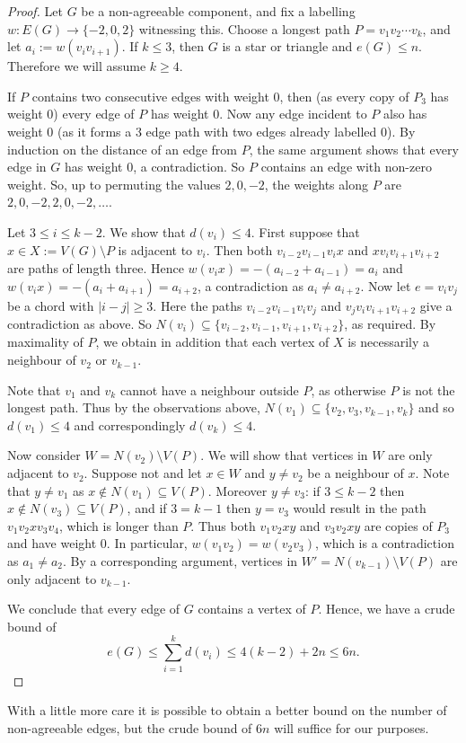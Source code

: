 \documentclass[A4paper,12pt]{article}
\theoremstyle{definition}
\begin{document}
\begin{proof}
Let $G$ be a non-agreeable component, and fix a labelling
$w:E(G)\to\{-2,0,2\}$ witnessing this. Choose a longest path
$P=v_1v_2\cdots v_k$, and let $a_i := w(v_iv_{i+1})$. If $k \le 3$, then $G$ is a star or triangle and $e(G) \le n$. Therefore we will assume $k \ge 4$. 

If $P$ contains two consecutive edges with weight 0, then (as every copy of $P_3$ has weight 0) every edge of $P$ has weight 0. Now any edge incident to $P$ also has weight 0 (as it forms a 3 edge path with two edges already labelled 0). By induction on the distance of an edge from $P$, the same argument shows
that every edge in $G$ has weight $0$, a contradiction. So $P$ contains an edge with non-zero weight. So, up to permuting the values $2,0,-2$,
the weights along $P$ are $2,0,-2,2,0,-2,\ldots$. 

Let $3\le i\le k-2$. We show that $d(v_i) \le 4$. First suppose that
$x \in X := V(G) \setminus P$ is adjacent to $v_i$. Then both
$v_{i-2}v_{i-1}v_ix$ and $xv_iv_{i+1}v_{i+2}$ are paths of length three.
Hence $w(v_ix)=-(a_{i-2}+a_{i-1})=a_i$ and $w(v_ix)=-(a_i+a_{i+1})=a_{i+2}$, a contradiction as $a_i\ne a_{i+2}$. Now let
$e=v_iv_j$ be a chord with $|i-j|\ge 3$. Here the paths
$v_{i-2}v_{i-1}v_iv_j$ and $v_jv_iv_{i+1}v_{i+2}$ give a contradiction as above. So $N(v_i) \subseteq \{v_{i-2},v_{i-1},v_{i+1},v_{i+2}\}$, as required. By maximality of $P$, we obtain in addition that each vertex of $X$ is necessarily a neighbour of $v_2$ or $v_{k-1}$. 

Note that $v_1$ and $v_k$ cannot have a neighbour outside $P$, as otherwise $P$ is not the longest path. Thus by the observations above, $N(v_1) \subseteq \{v_2,v_3,v_{k-1},v_k\}$ and so $d(v_1) \le 4$ and correspondingly $d(v_k) \le 4$. 

Now consider $W = N(v_2) \setminus V(P)$. We will
show that vertices in $W$ are only adjacent to $v_2$. Suppose not and let $x \in W$ and $y \ne v_2$ be a neighbour of $x$. Note that $y \ne v_1$ as $x \not\in N(v_1) \subseteq V(P)$. Moreover $y \ne v_3$: if $3\le k-2$ then $x \not\in N(v_3) \subseteq V(P)$, and if $3=k-1$ then $y = v_3$ would result in the path $v_1v_2xv_3v_4$, which is longer than $P$. Thus both $v_1v_2xy$ and $v_3v_2xy$ are copies of $P_3$ and have weight 0. In particular, $w(v_1v_2) = w(v_2v_3)$, which is a contradiction as $a_1 \ne a_2$.
By a corresponding argument, vertices in $W' = N(v_{k-1})\setminus V(P)$ are only adjacent to $v_{k-1}$.




We conclude that every edge of $G$ contains a vertex of $P$. Hence, we have a crude bound of
$$e(G) \le \sum_{i=1}^k d(v_i) \le 4(k-2) + 2n  \le 6n.$$

\end{proof}
With a little more care it is possible to obtain a better bound on the number of non-agreeable edges, but the crude bound of $6n$ will suffice for our purposes.
\end{document}
